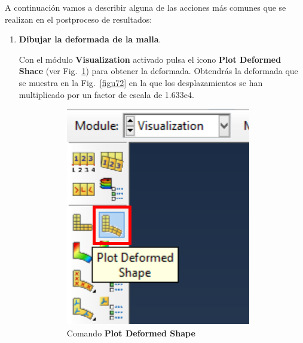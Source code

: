 A continuación vamos a describir alguna de las acciones más comunes
que se realizan en el postproceso de resultados:
\begin{enumerate}
\item \textbf{Dibujar la deformada de la malla}. ~

  Con el módulo \textbf{Visualization} activado pulsa el icono
  \textbf{Plot Deformed Shace} (ver Fig.~\ref{figu71}) para obtener la
  deformada. Obtendrás la deformada que se muestra en la
  Fig.~\ref{figu72} en la que los desplazamientos se han multiplicado
  por un factor de escala de 1.633e4.
  \begin{figure}[H]
    \centering
    \begin{subfigure}{0.25\textwidth}
      \includegraphics[width=\textwidth]{./body/images/imagen71.pdf}
      \caption{Comando \textbf{Plot Deformed Shape}}
      \label{figu71}
    \end{subfigure}%
    ~ %
    \begin{subfigure}{0.59\textwidth}

\end{subfigure}
\end{figure}
\end{enumerate}
